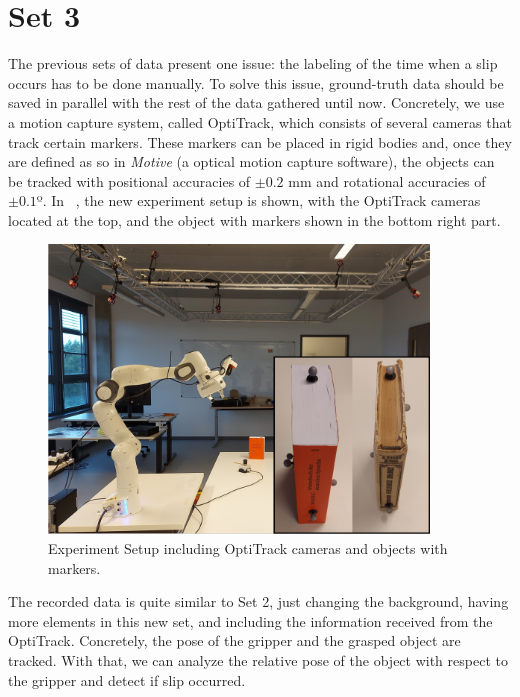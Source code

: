 \section{Set 3}

The previous sets of data present one issue: the labeling of the time when a slip occurs has to be done manually. To solve this issue, ground-truth data should be saved in parallel with the rest of the data gathered until now. Concretely, we use a motion capture system, called OptiTrack, which consists of several cameras that track certain markers. These markers can be placed in rigid bodies and, once they are defined as so in \textit{Motive} (a optical motion capture software), the objects can be tracked with positional accuracies of $\pm 0.2$ mm and rotational accuracies of $\pm 0.1$º. In ~, the new experiment setup is shown, with the OptiTrack cameras located at the top, and the object with markers shown in the bottom right part. 

\begin{figure}[H]
    \centering
    \includegraphics[width=0.9\textwidth]{resources/images/optitrack_setup}
    \caption{Experiment Setup including OptiTrack cameras and objects with markers.}\label{fig:optitrack}
\end{figure}

The recorded data is quite similar to Set 2, just changing the background, having more elements in this new set, and including the information received from the OptiTrack. Concretely, the pose of the gripper and the grasped object are tracked. With that, we can analyze the relative pose of the object with respect to the gripper and detect if slip occurred.\\

